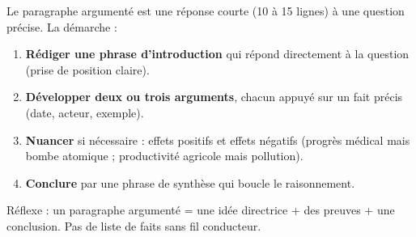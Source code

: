 \documentclass[11pt]{article}
\begin{document}
\begin{methode}
Le paragraphe argumenté est une réponse courte (10 à 15 lignes) à une question précise. La démarche :
\begin{enumerate}
\item \textbf{Rédiger une phrase d'introduction} qui répond directement à la question (prise de position claire).
\item \textbf{Développer deux ou trois arguments}, chacun appuyé sur un fait précis (date, acteur, exemple).
\item \textbf{Nuancer} si nécessaire : effets positifs et effets négatifs (progrès médical mais bombe atomique ; productivité agricole mais pollution).
\item \textbf{Conclure} par une phrase de synthèse qui boucle le raisonnement.
\end{enumerate}
Réflexe : un paragraphe argumenté = une idée directrice + des preuves + une conclusion. Pas de liste de faits sans fil conducteur.
\end{methode}
\end{document}
